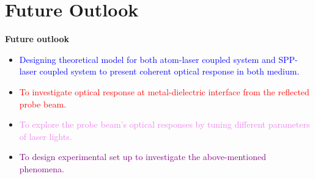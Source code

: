 \documentclass[9pt,aspectratio94]{beamer}
\begin{document}
   \section{\textbf{Future Outlook}}
   \begin{frame}{\textbf{Future outlook}}
   \begin{tcolorbox}
      [arc=3mm, colback=blue!5!white] 
     \begin{itemize}
           \item \textcolor{blue}{Designing theoretical model for both atom-laser coupled system and SPP-laser coupled system to present coherent optical response in both medium.}
           \end{itemize}
           \end{tcolorbox}
    \begin{tcolorbox}
      [arc=3mm, colback=yellow!5!white] 
     \begin{itemize}
           \item  \textcolor{red}{ To investigate optical response at metal-dielectric interface from the reflected probe beam.} 
           \end{itemize}
           \end{tcolorbox}
     \begin{tcolorbox}
      [arc=3mm, colback=blue!5!white] 
     \begin{itemize} 
           \item \textcolor{violet}{To explore the probe beam's optical responses by tuning different parameters of laser lights.}  
       \end{itemize}
       \end{tcolorbox}
   \begin{tcolorbox}
      [arc=3mm, colback=yellow!5!white] 
     \begin{itemize} 
           \item \textcolor{purple}{To design experimental set up to investigate the above-mentioned phenomena.}  
       \end{itemize}
       \end{tcolorbox}
\end{frame}
\end{document}
